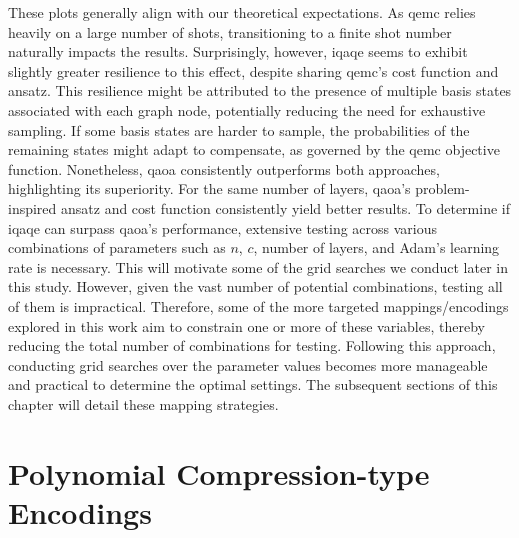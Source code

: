 These plots generally align with our theoretical expectations. As \acrshort{qemc} relies heavily on a large number of shots, transitioning to a finite shot number naturally impacts the results. Surprisingly, however, \acrshort{iqaqe} seems to exhibit slightly greater resilience to this effect, despite sharing \acrshort{qemc}'s cost function and ansatz. This resilience might be attributed to the presence of multiple basis states associated with each graph node, potentially reducing the need for exhaustive sampling. If some basis states are harder to sample, the probabilities of the remaining states might adapt to compensate, as governed by the \acrshort{qemc} objective function. Nonetheless, \acrshort{qaoa} consistently outperforms both approaches, highlighting its superiority. For the same number of layers, \acrshort{qaoa}'s problem-inspired ansatz and cost function consistently yield better results. To determine if \acrshort{iqaqe} can surpass \acrshort{qaoa}'s performance, extensive testing across various combinations of parameters such as $n$, $c$, number of layers, and Adam's learning rate is necessary. This will motivate some of the grid searches we conduct later in this study. However, given the vast number of potential combinations, testing all of them is impractical. Therefore, some of the more targeted mappings/encodings explored in this work aim to constrain one or more of these variables, thereby reducing the total number of combinations for testing. Following this approach, conducting grid searches over the parameter values becomes more manageable and practical to determine the optimal settings. The subsequent sections of this chapter will detail these mapping strategies.

\section{Polynomial Compression-type Encodings}
\label{section:Polynomial_Encodings}

